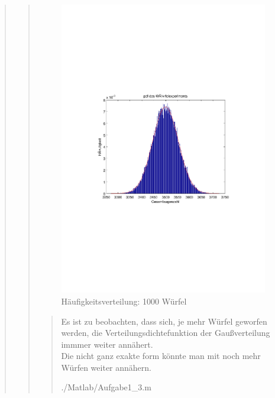 \begin{quote}
\begin{quote}
        \begin{figure}[H]
        \centering
            \includegraphics[scale=0.7, trim = 20mm 80mm 20mm 90mm, clip]{Bilder/A1_3_1000}
                \caption{Häufigkeitsverteilung: 1000 Würfel}
                \label{fig:A1_3_1000}
        \end{figure}
    


        \begin{quote}
            

            
            Es ist zu beobachten, dass sich, je mehr Würfel geworfen werden, die Verteilungsdichtefunktion der Gaußverteilung
            immmer weiter annähert.\\
            Die nicht ganz exakte form könnte man mit noch mehr Würfen weiter annähern.
            
            
            
                {./Matlab/Aufgabe1_3.m}
            
        \end{quote}
        
        
    \end{quote}
    
\end{quote}

